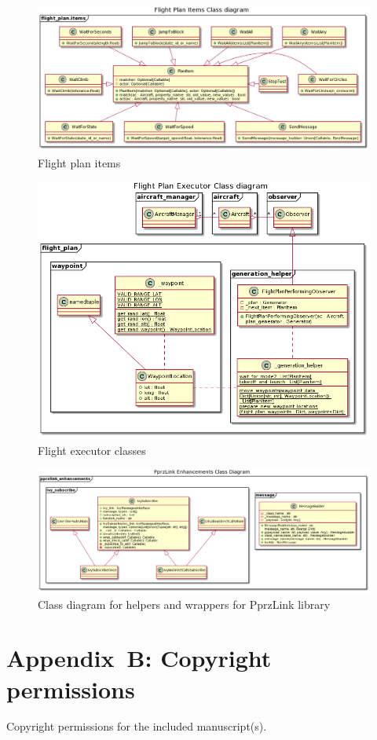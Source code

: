 \begin{figure}
    \centering
    \includegraphics[width=\textwidth]{UML/Flight_plan_items_CD.png}
    \caption{Flight plan items}
    \label{fig:flight_plan_items_class_diagram}
\end{figure}

\begin{figure}
    \centering
    \includegraphics[width=\textwidth]{UML/flight_plan_executor_CD.png}
    \caption{Flight executor classes}
    \label{fig:flight_plan_executor_class_diagram}
\end{figure}

\begin{landscape}
\begin{figure}
    \centering
    \includegraphics[width=.7\paperheight]{UML/pprzlink_enhancements_CD.png}
    \caption{Class diagram for helpers and wrappers for PprzLink library}
    \label{fig:pprzlink_enhancements_class_diagram}
\end{figure}
\end{landscape}

\chapter{Appendix~B: Copyright permissions}\label{appendixb}
Copyright permissions for the included manuscript(s).

